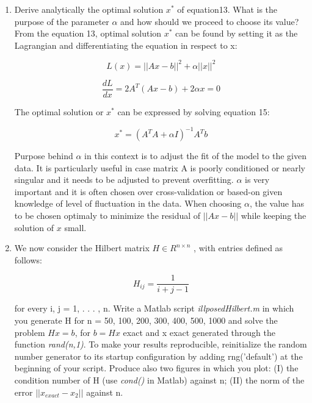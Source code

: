 \documentclass[unicode,11pt,a4paper,oneside,numbers=endperiod,openany]{scrartcl}
\newcommand{\norm}[1]{\lvert\lvert #1 \rvert\rvert}
\begin{document}
\begin{enumerate}[label=(\alph*)]
 \item Derive analytically the optimal solution ${x^*}$ of equation13. What is the purpose of the parameter 
 ${\alpha}$ and how should
we proceed to choose its value? \\

From the equation 13, optimal solution ${x^*}$ can be
found by setting it as the Lagrangian and differentiating the equation in respect to x:

\begin{equation}
 L(x) = \norm{Ax - b}^{2} + \alpha \norm{x}^2
\end{equation}

\begin{equation}
  \frac{dL}{dx} = 2A^T(Ax - b) + 2\alpha x = 0
\end{equation}

The optimal solution or ${x^*}$ can be expressed by solving equation 15:

\begin{equation}
  x^* = (A^TA + \alpha I)^{-1} A^Tb
\end{equation}

Purpose behind ${\alpha}$ in this context is to adjust the fit of the model to the given data. It is particularly useful in case matrix A is poorly conditioned or nearly singular and it needs to be adjusted to prevent overfitting. ${\alpha}$ is very important and it is often chosen over cross-validation or based-on given knowledge of level of fluctuation in the data. When choosing ${\alpha}$, the value has to be chosen optimaly to minimize the residual of ${\norm{Ax-b}}$ while keeping the solution of ${x}$ small. \\

\item We now consider the Hilbert matrix ${H \in R^{n\times n}}$ , with entries defined as follows:

\begin{equation}
 H_{ij} = \frac{1}{i + j - 1}
\end{equation}

for every i, j = 1, . . . , n. Write a Matlab script \textit{illposedHilbert.m} in which you generate H for n =
50, 100, 200, 300, 400, 500, 1000 and solve the problem ${Hx = b}$, for ${b = Hx}$ exact and x exact generated through
the function \textit{rand(n,1)}. To make your results reproducible, reinitialize the random number generator to its
startup configuration by adding rng(’default’) at the beginning of your script. Produce also two figures
in which you plot: (I) the condition number of H (use \textit{cond()} in Matlab) against n; (II) the norm of the error ${\norm{x_{exact} - x_{2}}}$ against n.


\end{enumerate}
\end{document}
